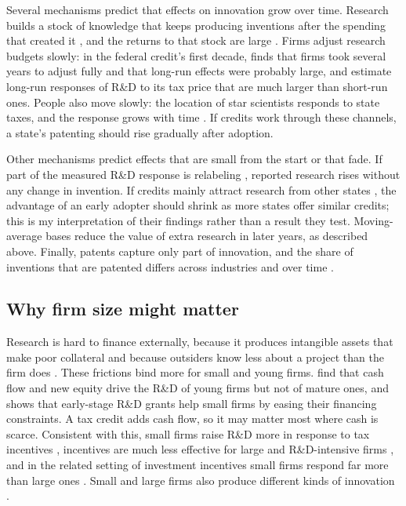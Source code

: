 \documentclass[12pt]{article}
\begin{document}
Several mechanisms predict that effects on innovation grow over time. Research builds a stock of knowledge
that keeps producing inventions after the spending that created it \citep{griliches1979issues}, and the
returns to that stock are large \citep{hall2010measuring}. Firms adjust research budgets slowly: in the
federal credit's first decade, \citet{hall1993rd} finds that firms took several years to adjust fully and that
long-run effects were probably large, and \citet{bloom2002credits} estimate long-run responses of R\&D to its
tax price that are much larger than short-run ones. People also move slowly: the location of star scientists
responds to state taxes, and the response grows with time \citep{moretti2017effect}. If credits work through
these channels, a state's patenting should rise gradually after adoption.

Other mechanisms predict effects that are small from the start or that fade. If part of the measured R\&D
response is relabeling \citep{chen2021notching}, reported research rises without any change in invention. If
credits mainly attract research from other states \citep{wilson2009beggar,moretti2014state}, the advantage of
an early adopter should shrink as more states offer similar credits; this is my interpretation of their
findings rather than a result they test. Moving-average bases reduce the value of extra research in later
years, as described above. Finally, patents capture only part of innovation, and the share of inventions that
are patented differs across industries and over time \citep{griliches1990patent}.

\subsection{Why firm size might matter}

Research is hard to finance externally, because it produces intangible assets that make poor collateral and
because outsiders know less about a project than the firm does \citep{hall2010financing}. These frictions bind
more for small and young firms. \citet{brown2009financing} find that cash flow and new equity drive the R\&D of
young firms but not of mature ones, and \citet{howell2017financing} shows that early-stage R\&D grants help
small firms by easing their financing constraints. A tax credit adds cash flow, so it may matter most where
cash is scarce. Consistent with this, small firms raise R\&D more in response to tax incentives
\citep{agrawal2020small,castellacci2015meta,rao2026tax}, incentives are much less effective for large and
R\&D-intensive firms \citep{appelt2025effective}, and in the related setting of investment incentives small
firms respond far more than large ones \citep{zwick2017tax}. Small and large firms also produce different
kinds of innovation \citep{akcigit2018growth}.
\end{document}
